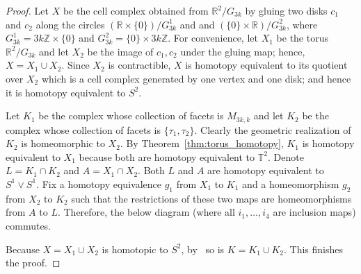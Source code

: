 \documentclass[12pt,a4paper]{amsart}
\theoremstyle{definition}
\newcommand{\R}{\ensuremath{\mathbb{R}}}
\newcommand{\T}{\ensuremath{\mathbb{T}}}
\newcommand{\Z}{\ensuremath{\mathbb{Z}}}
\numberwithin{equation}{section}
\begin{document}
\begin{proof}
Let $X$ be the cell complex obtained from $\R^2/G_{3k}$ by gluing two disks $c_1$ and $c_2$ along the circles $(\R\times \{0\})/G^1_{3k}$ and and $(\{0\}\times \R)/G^2_{3k}$,  where $G^1_{3k} = 3k\Z\times\{0\}$ and $G^2_{3k}= \{0\}\times 3k\Z$.
For convenience, let $X_1$ be the torus $\R^2/G_{3k}$ and let $X_2$ be the image of $c_1, c_2$ under the gluing map; hence, $X=X_1\cup X_2$.
Since $X_2$ is contractible, $X$ is homotopy equivalent to its quotient over $X_2$ which is a cell complex generated by one vertex and one disk; and hence it is homotopy equivalent to $S^2$.

Let $K_1$ be the complex whose collection of facets is $M_{3k,k}$ and let $K_2$ be the complex whose collection of facets is $\{\tau_1, \tau_2\}$.
Clearly the geometric realization of $K_2$ is homeomorphic to $X_2$.
By Theorem~\ref{thm:torus_homotopy}, $K_1$ is homotopy equivalent to $X_1$ because both are homotopy equivalent to $\T^2$.
Denote $L= K_1\cap K_2$ and $A = X_1\cap X_2$.
Both $L$ and $A$ are homotopy equivalent to $S^1\vee S^1$.
Fix a homotopy equivalence $g_1$ from $X_1$ to $K_1$ and a homeomorphism $g_2$ from $X_2$ to $K_2$ such that the restrictions of these two maps are homeomorphisms from $A$ to $L$.
Therefore, the below diagram (where all $i_1, \ldots, i_4$ are inclusion maps) commutes.

\begin{center}
\end{center}
Because $X=X_1\cup X_2$ is homotopic to $S^2$, by~\cite[7.5.7]{Brown} so is $K=K_1\cup K_2$.
This finishes the proof.
\end{proof}
\end{document}

